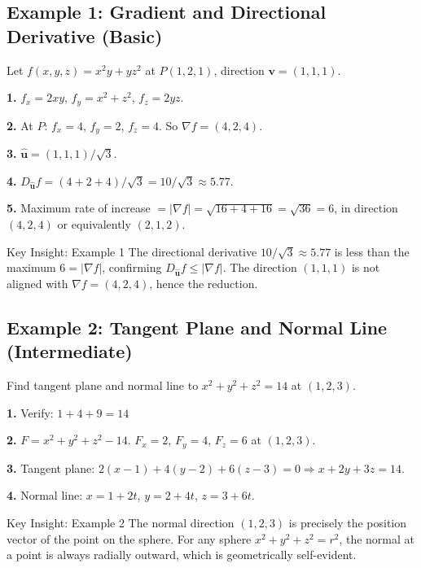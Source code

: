 \documentclass[12pt,a4paper]{article}
\begin{document}
\subsection*{Example 1: Gradient and Directional Derivative (Basic)}

Let $f(x,y,z) = x^2 y + yz^2$ at $P(1,2,1)$, direction $\mathbf{v} = (1,1,1)$.

\textbf{1.} $f_x = 2xy$,\; $f_y = x^2 + z^2$,\; $f_z = 2yz$.

\textbf{2.} At $P$: $f_x = 4$, $f_y = 2$, $f_z = 4$. So $\nabla f = (4,2,4)$.

\textbf{3.} $\hat{\mathbf{u}} = (1,1,1)/\sqrt{3}$.

\textbf{4.} $D_{\hat{\mathbf{u}}} f = (4+2+4)/\sqrt{3} = 10/\sqrt{3} \approx 5.77$.

\textbf{5.} Maximum rate of increase $= |\nabla f| = \sqrt{16+4+16} = \sqrt{36} = 6$, in direction $(4,2,4)$ or equivalently $(2,1,2)$.

\begin{learnbox}{Key Insight: Example 1}
The directional derivative $10/\sqrt{3} \approx 5.77$ is less than the maximum $6 = |\nabla f|$, confirming $D_{\hat{\mathbf{u}}} f \leq |\nabla f|$. The direction $(1,1,1)$ is not aligned with $\nabla f = (4,2,4)$, hence the reduction.
\end{learnbox}

\subsection*{Example 2: Tangent Plane and Normal Line (Intermediate)}

Find tangent plane and normal line to $x^2 + y^2 + z^2 = 14$ at $(1,2,3)$.

\textbf{1.} Verify: $1 + 4 + 9 = 14$ \checkmark

\textbf{2.} $F = x^2+y^2+z^2-14$. $F_x = 2$, $F_y = 4$, $F_z = 6$ at $(1,2,3)$.

\textbf{3.} Tangent plane: $2(x-1)+4(y-2)+6(z-3)=0 \Rightarrow x+2y+3z=14$.

\textbf{4.} Normal line: $x=1+2t$,\; $y=2+4t$,\; $z=3+6t$.

\begin{learnbox}{Key Insight: Example 2}
The normal direction $(1,2,3)$ is precisely the position vector of the point on the sphere. For any sphere $x^2+y^2+z^2=r^2$, the normal at a point is always radially outward, which is geometrically self-evident.
\end{learnbox}
\end{document}
